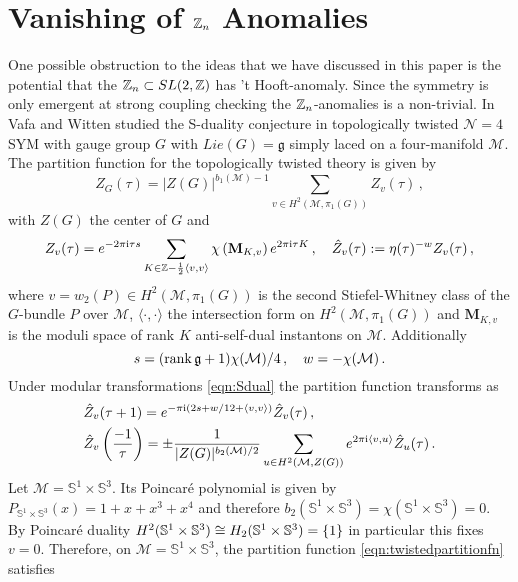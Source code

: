 \documentclass[main.tex]{subfiles}
\begin{document}
\section{Vanishing of \texorpdfstring{$\mathbb{Z}_{n}$}{Zn} Anomalies}\label{Sec:thooftanomaly}
One possible obstruction to the ideas that we have discussed in this paper is the potential that the $\mathbb{Z}_{n}\subset SL(2,\mathbb{Z})$ has 't Hooft-anomaly. Since the symmetry is only emergent at strong coupling checking the $\mathbb{Z}_{n}$-anomalies is a non-trivial.
In \cite{Vafa:1994tf} Vafa and Witten studied the S-duality conjecture in topologically twisted $\mathcal{N}=4$ SYM with gauge group $G$ with $Lie(G)=\mathfrak{g}$ simply laced on a four-manifold $\mathcal{M}$. The partition function for the topologically twisted theory is given by \cite{Vafa:1994tf}
\begin{equation}\label{eqn:twistedpartitionfn}
Z_G(\tau)=|Z(G)|^{b_1(\mathcal{M})-1}\sum_{v\in H^2(\mathcal{M},\pi_1(G))}Z_v(\tau)\,,
\end{equation}
with $Z(G)$ the center of $G$ and
\begin{equation}
Z_v(\tau)=e^{-2\pi\mathrm{i}\tau s}\sum_{K\in\mathbb{Z}-\frac{1}{2}\langle v,v\rangle}\chi\left(\mathbf{M}_{K,v}\right)e^{2\pi\mathrm{i}\tau K}\,,\quad \hat{Z}_v(\tau):=\eta(\tau)^{-w}Z_v(\tau)\,,
\end{equation}
where $v=w_2(P)\in H^2(\mathcal{M},\pi_1(G))$ is the second Stiefel-Whitney class of the $G$-bundle $P$ over $\mathcal{M}$, $\langle\cdot,\cdot\rangle$ the intersection form on $H^2(\mathcal{M},\pi_1(G))$ and $\mathbf{M}_{K,v}$ is the moduli space of rank $K$ anti-self-dual instantons on $\mathcal{M}$. Additionally \cite{Vafa:1994tf,Labastida:1999ij,Jinzenji:2002if,Wu:2008bv}
\begin{equation}
s=(\operatorname{rank}\mathfrak{g}+1)\chi(\mathcal{M})/4\,,\quad w=-\chi(\mathcal{M})\,.
\end{equation}
Under modular transformations \eqref{eqn:Sdual} the partition function transforms as
\begin{align}
&\hat{Z}_v(\tau+1)=e^{-\pi\mathrm{i}\left(2s+w/12+\langle v,v\rangle\right)}\hat{Z}_v(\tau)\,,\\
&\hat{Z}_v\left(\frac{-1}{\tau}\right)=\pm\frac{1}{|Z(G)|^{b_2(\mathcal{M})/2}}\sum_{u\in H^2(\mathcal{M},Z(G))}e^{2\pi\mathrm{i}\langle v,u\rangle}\hat{Z}_u(\tau)\,.
\end{align}
Let $\mathcal{M}=\mathbb{S}^1\times\mathbb{S}^3$. Its Poincar\'e polynomial is given by $P_{\mathbb{S}^1\times\mathbb{S}^3}(x)=1+x+x^3+x^4$ and therefore $b_2(\mathbb{S}^1\times\mathbb{S}^3)=\chi(\mathbb{S}^1\times\mathbb{S}^3)=0$. By Poincar\'e duality $ H^2(\mathbb{S}^1\times\mathbb{S}^3)\cong H_{2}(\mathbb{S}^1\times\mathbb{S}^3)=\{1\}$ in particular this fixes $v=0$. Therefore, on $\mathcal{M}=\mathbb{S}^1\times\mathbb{S}^3$, the partition function \eqref{eqn:twistedpartitionfn} satisfies 
\end{document}
